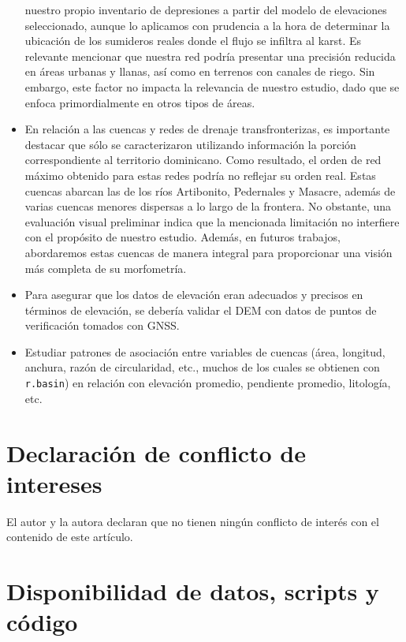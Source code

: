 \documentclass[spanish]{article}
\begin{document}
\begin{itemize}
  nuestro propio inventario de depresiones a partir del modelo de
  elevaciones seleccionado, aunque lo aplicamos con prudencia a la hora
  de determinar la ubicación de los sumideros reales donde el flujo se
  infiltra al karst. Es relevante mencionar que nuestra red podría
  presentar una precisión reducida en áreas urbanas y llanas, así como
  en terrenos con canales de riego. Sin embargo, este factor no impacta
  la relevancia de nuestro estudio, dado que se enfoca primordialmente
  en otros tipos de áreas.
\item
  En relación a las cuencas y redes de drenaje transfronterizas, es
  importante destacar que sólo se caracterizaron utilizando información
  la porción correspondiente al territorio dominicano. Como resultado,
  el orden de red máximo obtenido para estas redes podría no reflejar su
  orden real. Estas cuencas abarcan las de los ríos Artibonito,
  Pedernales y Masacre, además de varias cuencas menores dispersas a lo
  largo de la frontera. No obstante, una evaluación visual preliminar
  indica que la mencionada limitación no interfiere con el propósito de
  nuestro estudio. Además, en futuros trabajos, abordaremos estas
  cuencas de manera integral para proporcionar una visión más completa
  de su morfometría.
\item
  Para asegurar que los datos de elevación eran adecuados y precisos en
  términos de elevación, se debería validar el DEM con datos de puntos
  de verificación tomados con GNSS.
\item
  Estudiar patrones de asociación entre variables de cuencas (área,
  longitud, anchura, razón de circularidad, etc., muchos de los cuales
  se obtienen con \texttt{r.basin}) en relación con elevación promedio,
  pendiente promedio, litología, etc.
\end{itemize}

\hypertarget{declaraciuxf3n-de-conflicto-de-intereses}{%
\section*{Declaración de conflicto de
intereses}\label{declaraciuxf3n-de-conflicto-de-intereses}}

El autor y la autora declaran que no tienen ningún conflicto de interés
con el contenido de este artículo.

\hypertarget{disponibilidad-de-datos-scripts-y-cuxf3digo}{%
\section*{Disponibilidad de datos, scripts y
código}\label{disponibilidad-de-datos-scripts-y-cuxf3digo}}
\end{document}
